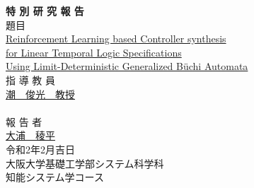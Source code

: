 \documentclass[a4j,12pt,oneside,openany,english,dvipdfmx]{jsbook}
\begin{document}
\thispagestyle{empty}
\begin{center}
\vspace*{5mm}
{\Huge {\bf 特 \hspace{12pt} 別 \hspace{12pt} 研 \hspace{12pt} 究 \hspace{12pt} 報 \hspace{12pt} 告}}\\
\vspace{2cm}
{\Large 題\hspace{8mm}目}\\
\vspace{1cm}
\underline{\Large{ Reinforcement Learning based Controller synthesis}} \\
\vspace{0.5cm}
\underline{\Large{ for Linear Temporal Logic Specifications }} \\
\vspace{0.5cm}
\underline{\Large{Using Limit-Deterministic Generalized B\"{u}chi Automata}} \\
\vspace{12mm}
{\large 指 導 教 員}\\
\vspace{6mm}
\underline{\Large 潮　俊光　教授}\\
　\\
\vspace{8mm}
{\large 報 告 者}\\
\vspace{6mm}
\underline{\Large 大浦　稜平}\\
\vspace{10mm}
{\Large 令和2年2月吉日}\\
\vspace{14mm}
{\Large 大阪大学基礎工学部システム科学科\\知能システム学コース}\\
\end{center}
\clearpage
\setcounter{page}{0}

\begin{abstract}
  
\end{abstract}
\end{document}
